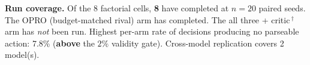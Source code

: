 \noindent \textbf{Run coverage.} Of the $8$ factorial cells, \textbf{8} have completed at $n=20$ paired seeds. The OPRO (budget-matched rival) arm has completed. The all three + critic\,$^{\dagger}$ arm has \emph{not} been run. Highest per-arm rate of decisions producing no parseable action: 7.8\% (\textbf{above} the $2\%$ validity gate). Cross-model replication covers 2 model(s).
